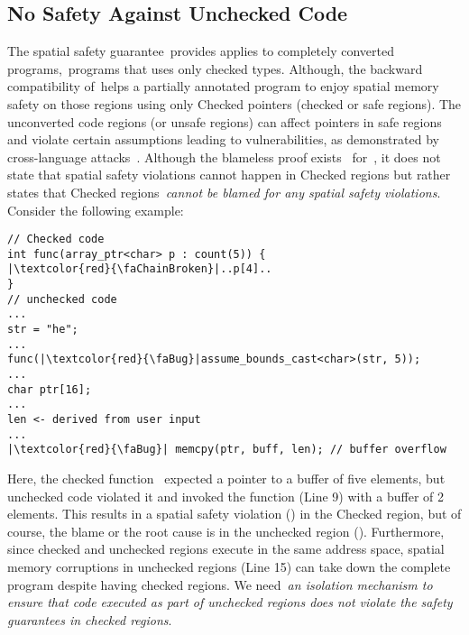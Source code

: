 \subsection{No Safety Against Unchecked Code}
\label{subsec:nosafetyagsintuncheckedcode}
The spatial safety guarantee~\checkedc provides applies to completely converted programs,~\ie programs that uses only checked types.
Although, the backward compatibility of~\checkedc helps a partially annotated program to enjoy spatial memory safety on those regions using only Checked pointers (\ie checked or safe regions).
The unconverted code regions (or unsafe regions) can affect pointers in safe regions and violate certain assumptions leading to vulnerabilities, as demonstrated by cross-language attacks~\cite{mergendahlcross}.
Although the blameless proof exists~\cite{ruef2019achieving, li22checkedc} for~\checkedc, it does not state that spatial safety violations cannot happen in Checked regions but rather states that Checked regions~\emph{cannot be blamed for any spatial safety violations}.
Consider the following example:
\begin{verbatim}
// Checked code
int func(array_ptr<char> p : count(5)) {
|\textcolor{red}{\faChainBroken}|..p[4]..
}
// unchecked code
...
str = "he";
...
func(|\textcolor{red}{\faBug}|assume_bounds_cast<char>(str, 5)); 
...
char ptr[16];
...
len <- derived from user input
...
|\textcolor{red}{\faBug}| memcpy(ptr, buff, len); // buffer overflow
\end{verbatim}
Here, the checked function~ expected a pointer to a buffer of five elements, but unchecked code violated it and invoked the function (Line 9) with a buffer of 2 elements.
This results in a spatial safety violation (\textcolor{red}{\faChainBroken}) in the Checked region, but of course, the blame or the root cause is in the unchecked region (\textcolor{red}{\faBug}).
Furthermore, since checked and unchecked regions execute in the same address space, spatial memory corruptions in unchecked regions (Line 15) can take down the complete program despite having checked regions.
We need~\emph{an isolation mechanism to ensure that code executed as part of unchecked regions does not violate the safety guarantees in checked regions}.

